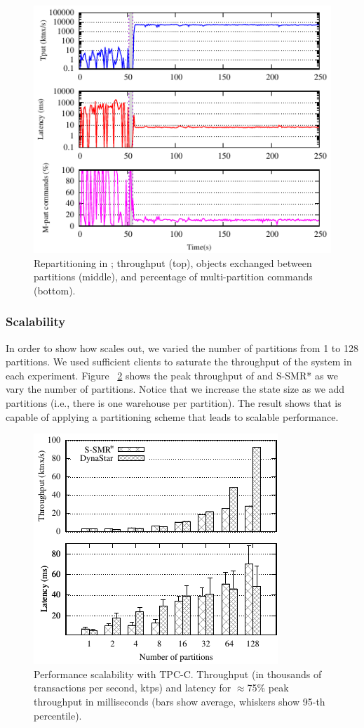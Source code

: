\begin{figure}[ht!]
  \centering
    \includegraphics[width=0.8\columnwidth]{figures/experiments/dynastar/tpcc-detail-dynastar}
  \caption{Repartitioning in \dynastar; throughput (top), objects exchanged between partitions (middle),
  and percentage of multi-partition commands (bottom).}
  \label{fig:tpcc_repartitioning}
\end{figure}

\subsubsection{Scalability}
In order to show how \dynastar scales out, we varied the number of partitions
from 1 to 128 partitions. We used sufficient clients to  saturate the throughput
of the system in each experiment. Figure ~\ref{fig:tpcc_scaling} shows the peak
throughput of \dynastar and S-SMR* as we vary the number of partitions. Notice
that we increase the state size as we add partitions (i.e., there is one
warehouse per partition). The result shows that \dynastar is capable of applying
a partitioning scheme that leads to scalable performance.

\begin{figure}[ht!]
  \centering
    \includegraphics[width=0.6\columnwidth]{figures/experiments/dynastar/tpcc-scaling-tp-lat.pdf}
  \caption{Performance scalability with TPC-C. Throughput (in thousands of transactions per second, ktps) and latency for $\approx$75\% peak throughput in milliseconds (bars show average, whiskers show 95-th percentile).}
  \label{fig:tpcc_scaling}
\end{figure}

